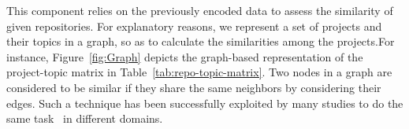 This component relies on the previously encoded data to assess the similarity 
of given repositories. For explanatory reasons, we represent a set of projects 
and their topics in a graph, so as to calculate the similarities among the 
projects.For instance, Figure~\ref{fig:Graph} depicts the graph-based 
representation of the project-topic matrix in Table~\ref{tab:repo-topic-matrix}.  
%
Two nodes in a graph are considered to be similar if they share the same neighbors by considering their edges. Such a technique has been successfully exploited by many studies to do the same task~\cite{BRIGUEZ20146467} in different domains.


